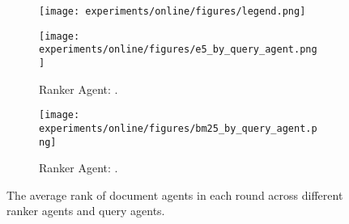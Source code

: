 \begin{figure}
    \centering
    \scriptsize
    \begin{subfigure}{0.3\textwidth}
        \centering
\texttt{[image: experiments/online/figures/legend.png]}
    \end{subfigure}
    \begin{subfigure}{0.45\textwidth}
        \centering
        \texttt{[image: experiments/online/figures/e5\_by\_query\_agent.png]}
        \caption{Ranker Agent: \efive.}
        \label{fig:e5_misalignment}
    \end{subfigure}
    \hfill
    \begin{subfigure}{0.45\textwidth}
        \centering
        \texttt{[image: experiments/online/figures/bm25\_by\_query\_agent.png]}
        \caption{Ranker Agent: \bm.}
        \label{fig:bm25_misalignment}
    \end{subfigure}
    \caption{The average rank of document agents in each round across different ranker agents and query agents.}
\label{fig:query_ranker_misalignment}
\end{figure}
